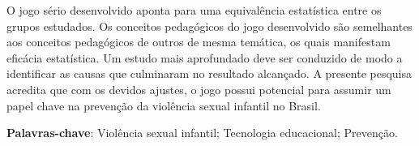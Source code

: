 \begin{resumo}
  O jogo sério desenvolvido aponta para uma equivalência estatística entre os grupos estudados. Os conceitos pedagógicos do jogo desenvolvido são semelhantes aos conceitos pedagógicos de outros de mesma temática, os quais manifestam eficácia estatística. Um estudo mais aprofundado deve ser conduzido de modo a identificar as causas que culminaram no resultado alcançado. A presente pesquisa acredita que com os devidos ajustes, o jogo possui potencial para assumir um papel chave na prevenção da violência sexual infantil no Brasil.
 

   
 \textbf{Palavras-chave}: Violência sexual infantil; Tecnologia educacional; Prevenção.
\end{resumo}
